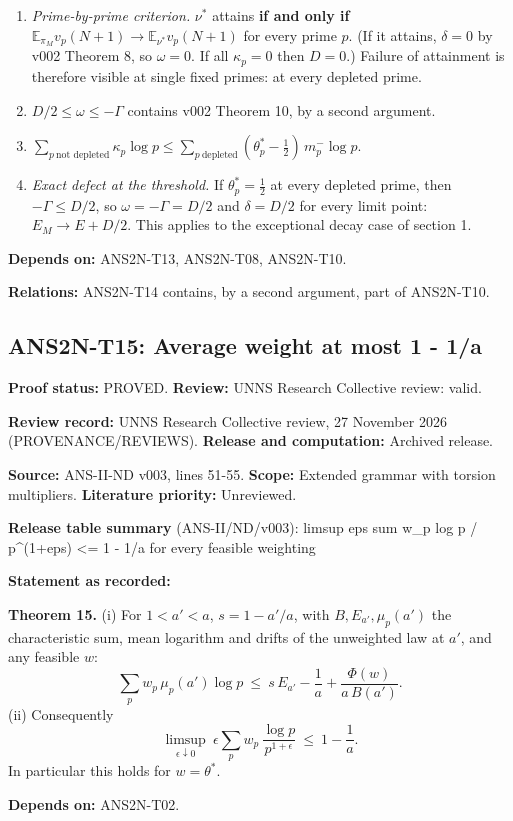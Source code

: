 \documentclass[
  11pt,
]{article}
\providecommand{\tightlist}{%
  \setlength{\itemsep}{0pt}\setlength{\parskip}{0pt}}
\begin{document}
\begin{enumerate}
\def\labelenumi{\arabic{enumi}.}
\tightlist
\item
  \emph{Prime-by-prime criterion.} \(\nu^\ast\) attains \textbf{if and
  only if} \(\mathbb E_{\pi_M}v_p(N+1)\to\mathbb E_{\nu^\ast}v_p(N+1)\)
  for every prime \(p\). (If it attains, \(\delta=0\) by v002 Theorem 8,
  so \(\omega=0\). If all \(\kappa_p=0\) then \(D=0\).) Failure of
  attainment is therefore visible at single fixed primes: at every
  depleted prime.
\item
  \(D/2\le\omega\le-\Gamma\) contains v002 Theorem 10, by a second
  argument.
\item
  \(\sum_{p\ \text{not depleted}}\kappa_p\log p\le\sum_{p\ \text{depleted}}(\theta^\ast_p-\tfrac12)\,m_p^-\log p\).
\item
  \emph{Exact defect at the threshold.} If \(\theta^\ast_p=\frac12\) at
  every depleted prime, then \(-\Gamma\le D/2\), so
  \(\omega=-\Gamma=D/2\) and \(\delta=D/2\) for every limit point:
  \(E_M\to E+D/2\). This applies to the exceptional decay case of
  section 1.
\end{enumerate}

\textbf{Depends on:} ANS2N-T13, ANS2N-T08, ANS2N-T10.

\textbf{Relations:} ANS2N-T14 contains, by a second argument, part of
ANS2N-T10.

\hypertarget{ans2n-t15-average-weight-at-most-1---1a}{%
\subsection{ANS2N-T15: Average weight at most 1 -
1/a}\label{ans2n-t15-average-weight-at-most-1---1a}}

\textbf{Proof status:} PROVED. \textbf{Review:} UNNS Research Collective
review: valid.

\textbf{Review record:} UNNS Research Collective review, 27 November
2026 (PROVENANCE/REVIEWS). \textbf{Release and computation:} Archived
release.

\textbf{Source:} ANS-II-ND v003, lines 51-55. \textbf{Scope:} Extended
grammar with torsion multipliers. \textbf{Literature priority:}
Unreviewed.

\textbf{Release table summary} (ANS-II/ND/v003): limsup eps sum w\_p log
p / p\^{}(1+eps) \textless= 1 - 1/a for every feasible weighting

\textbf{Statement as recorded:}

\textbf{Theorem 15.} (i) For \(1<a'<a\), \(s=1-a'/a\), with
\(B,E_{a'},\mu_p(a')\) the characteristic sum, mean logarithm and drifts
of the unweighted law at \(a'\), and any feasible \(w\):
\[\sum_pw_p\,\mu_p(a')\log p\ \le\ s\,E_{a'}-\frac1a+\frac{\Phi(w)}{a\,B(a')}.\]
(ii) Consequently
\[\limsup_{\epsilon\downarrow0}\ \epsilon\sum_pw_p\,\frac{\log p}{p^{1+\epsilon}}\ \le\ 1-\frac1a .\]
In particular this holds for \(w=\theta^\ast\).

\textbf{Depends on:} ANS2N-T02.
\end{document}

